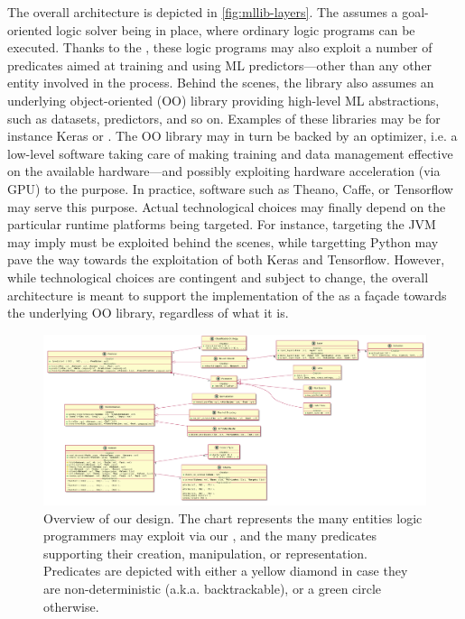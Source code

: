 \documentclass[12pt,a4paper,openright,twoside]{book}
\begin{document}
The overall architecture is depicted in \cref{fig:mllib-layers}.
%
The \mllib{} assumes a goal-oriented logic solver being in place, where ordinary logic programs can be executed.
%
Thanks to the \mllib{}, these logic programs may also exploit a number of predicates aimed at training and using ML predictors---other than any other entity involved in the process.
%
Behind the scenes, the library also assumes an underlying object-oriented (OO) library providing high-level ML abstractions, such as datasets, predictors, and so on.
%
Examples of these libraries may be for instance Keras or \deeplearningforj{}.
%
The OO library may in turn be backed by an optimizer, i.e. a low-level software taking care of making training and data management effective on the available hardware---and possibly exploiting hardware acceleration (via GPU) to the purpose.
%
In practice, software such as Theano, Caffe, or Tensorflow may serve this purpose.
%
Actual technological choices may finally depend on the particular runtime platforms being targeted.
%
For instance, targeting the JVM may imply \deeplearningforj{} must be exploited behind the scenes, while targetting Python may pave the way towards the exploitation of both Keras and Tensorflow.
%
However, while technological choices are contingent and subject to change, the overall architecture is meant to support the implementation of the \mllib{} as a façade towards the underlying OO library, regardless of what it is.

\begin{figure}
    \centering
    \includegraphics[width=\linewidth]{figures/entities.pdf}
    \caption{Overview of our \mllib{} design. The chart represents the many entities logic programmers may exploit via our \mllib{}, and the many predicates supporting their creation, manipulation, or representation. Predicates are depicted with either a yellow diamond in case they are non-deterministic (a.k.a. backtrackable), or a green circle otherwise.}
    \label{fig:design-overview}
\end{figure}
\end{document}
